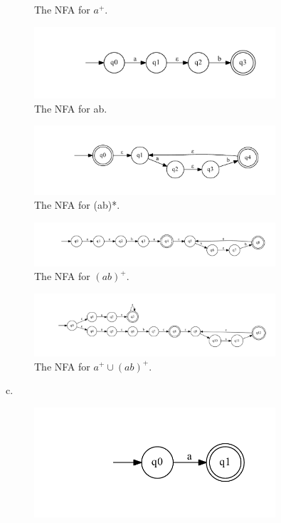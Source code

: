 \documentclass[10pt] {article}
\begin{document}
\begin{enumerate}
\begin{figure}[H]
\caption{The NFA for $a^{+}$.}
\label{40}
\end{figure}
\begin{figure}[H]
\includegraphics[width=0.8\textwidth]{be28.pdf}
\caption{The NFA for ab.}
\label{41}
\end{figure}
\begin{figure}[H]
\includegraphics[width=0.8\textwidth]{bf28.pdf}
\caption{The NFA for (ab)*.}
\label{42}
\end{figure}
\begin{figure}[H]
\includegraphics[width=0.8\textwidth]{bg28.pdf}
\caption{The NFA for $(ab)^{+}$.}
\label{43}
\end{figure}
\begin{figure}[H]
\includegraphics[width=0.8\textwidth]{bh28.pdf}
\caption{The NFA for $a^{+} \cup (ab)^{+}$.}
\label{44}
\end{figure}
c.\begin{figure}[H]
\includegraphics[width=0.8\textwidth]{aa28.pdf}

\end{figure}
\end{enumerate}
\end{document}
